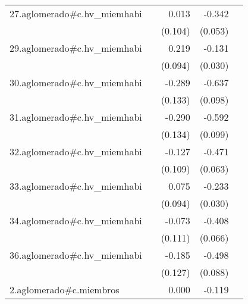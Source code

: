 {\begin{longtable}{l*{4}{D{.}{.}{-1}}}
\addlinespace
27.aglomerado#c.hv\_miemhabi&                     &       0.013         &      -0.342\sym{***}&                     \\
            &                     &     (0.104)         &     (0.053)         &                     \\
\addlinespace
29.aglomerado#c.hv\_miemhabi&                     &       0.219\sym{*}  &      -0.131\sym{***}&                     \\
            &                     &     (0.094)         &     (0.030)         &                     \\
\addlinespace
30.aglomerado#c.hv\_miemhabi&                     &      -0.289\sym{*}  &      -0.637\sym{***}&                     \\
            &                     &     (0.133)         &     (0.098)         &                     \\
\addlinespace
31.aglomerado#c.hv\_miemhabi&                     &      -0.290\sym{*}  &      -0.592\sym{***}&                     \\
            &                     &     (0.134)         &     (0.099)         &                     \\
\addlinespace
32.aglomerado#c.hv\_miemhabi&                     &      -0.127         &      -0.471\sym{***}&                     \\
            &                     &     (0.109)         &     (0.063)         &                     \\
\addlinespace
33.aglomerado#c.hv\_miemhabi&                     &       0.075         &      -0.233\sym{***}&                     \\
            &                     &     (0.094)         &     (0.030)         &                     \\
\addlinespace
34.aglomerado#c.hv\_miemhabi&                     &      -0.073         &      -0.408\sym{***}&                     \\
            &                     &     (0.111)         &     (0.066)         &                     \\
\addlinespace
36.aglomerado#c.hv\_miemhabi&                     &      -0.185         &      -0.498\sym{***}&                     \\
            &                     &     (0.127)         &     (0.088)         &                     \\
\addlinespace
2.aglomerado#c.miembros&                     &       0.000         &      -0.119\sym{***}&                     \\

\end{longtable}}
